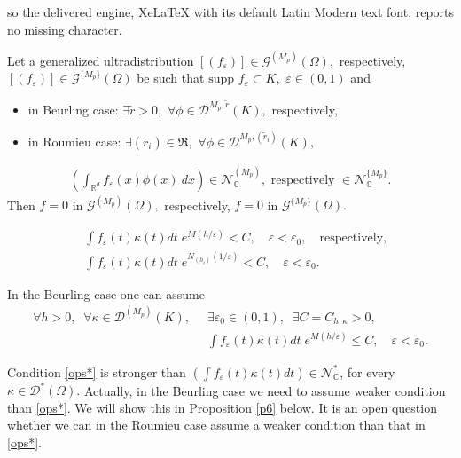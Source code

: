 \documentclass[10pt,a4paper]{amsart}
\begin{document}
so the delivered engine, XeLaTeX with its default Latin Modern text font, reports no missing character.
\begin{theorem}\label{thm 4.1}
Let a generalized ultradistribution $[(f_\varepsilon)]\in\mathcal{G}^{(M_p)}(\Omega),$ respectively, $[(f_\varepsilon)]\in \mathcal{G}^{\{M_p\}}(\Omega)$ be such that $\mbox{supp }f_\varepsilon\subset K,$ $\varepsilon\in (0,1)$ and 
\begin{itemize}
\item in Beurling case: $\exists \tilde r>0,$ $\forall \phi\in \mathcal D^{M_p,\tilde r}(K),$ respectively,
\item in Roumieu case: $\exists (\tilde r_i)\in\mathfrak{R},$ $\forall \phi\in \mathcal D^{M_p,(\tilde r_i)}(K),$
\end{itemize}
\begin{align}\label{nulcon}
\left(\int_{\mathbb{R}^d}f_\varepsilon(x)\phi(x)\ dx\right)\in \mathcal{N}^{(M_p)}_\mathbb{C},\text{ respectively }\in \mathcal{N}^{\{M_p\}}_\mathbb{C}.
\end{align}
Then $f=0$ in $\mathcal{G}^{(M_p)}(\Omega),$ respectively, $f=0$ in $\mathcal{G}^{\{M_p\}}(\Omega).$
\end{theorem}

\begin{align}\label{ops*}
&\int f_\varepsilon(t)\kappa(t)dt\; e^{M(h/\varepsilon)}<C,\quad \varepsilon<\varepsilon_0,\quad %
\text{respectively,}\\ \nonumber
&\int f_\varepsilon(t)\kappa(t)dt \;e^{N_{(h_i)}(1/\varepsilon)}<C,\quad \varepsilon<\varepsilon_0.
\end{align}

\begin{proposition}\label{p6}
In the Beurling case one can assume 
\begin{align*}
\forall h>0,\;\;\forall \kappa\in\mathcal{D}^{(M_p)}(K),\;\;&\exists \varepsilon_0\in (0,1),\;\;\exists C=C_{h,\kappa}>0,\\
&\int f_\varepsilon(t)\kappa(t)dt\;e^{M(h/\varepsilon)}\leq C,\quad \varepsilon<\varepsilon_0.
\end{align*}
\end{proposition}

\begin{remark} Condition \eqref{ops*} is stronger than $\left(\int f_\varepsilon(t)\kappa(t)dt\right) \in\mathcal N^\ast_\mathbb{C}$, for every $\kappa\in \mathcal{D}^\ast(\Omega).$ Actually, in the Beurling case we need to assume weaker condition than \eqref{ops*}. We will show this in Proposition \ref{p6} below. It is an open question whether we can in the Roumieu case assume a weaker condition than that in \eqref{ops*}.
\end{remark}
\end{document}
